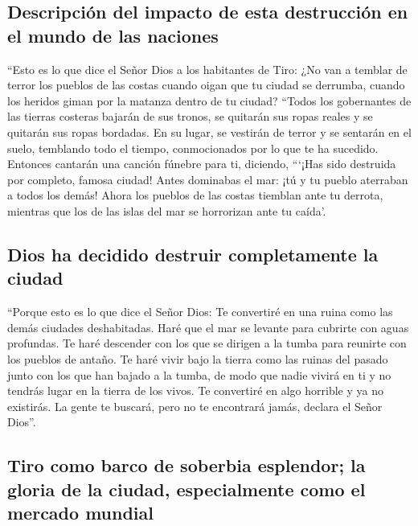 \hypertarget{descripciuxf3n-del-impacto-de-esta-destrucciuxf3n-en-el-mundo-de-las-naciones}{%
\subsection{Descripción del impacto de esta destrucción en el mundo de
las
naciones}\label{descripciuxf3n-del-impacto-de-esta-destrucciuxf3n-en-el-mundo-de-las-naciones}}

 ``Esto es lo que dice el Señor Dios a los habitantes de
Tiro: ¿No van a temblar de terror los pueblos de las costas cuando oigan
que tu ciudad se derrumba, cuando los heridos giman por la matanza
dentro de tu ciudad?  ``Todos los gobernantes de las
tierras costeras bajarán de sus tronos, se quitarán sus ropas reales y
se quitarán sus ropas bordadas. En su lugar, se vestirán de terror y se
sentarán en el suelo, temblando todo el tiempo, conmocionados por lo que
te ha sucedido.  Entonces cantarán una canción fúnebre
para ti, diciendo, ```¡Has sido destruida por completo, famosa ciudad!
Antes dominabas el mar: ¡tú y tu pueblo aterraban a todos los demás!
 Ahora los pueblos de las costas tiemblan ante tu
derrota, mientras que los de las islas del mar se horrorizan ante tu
caída'.

\hypertarget{dios-ha-decidido-destruir-completamente-la-ciudad}{%
\subsection{Dios ha decidido destruir completamente la
ciudad}\label{dios-ha-decidido-destruir-completamente-la-ciudad}}

 ``Porque esto es lo que dice el Señor Dios: Te
convertiré en una ruina como las demás ciudades deshabitadas. Haré que
el mar se levante para cubrirte con aguas profundas.  Te
haré descender con los que se dirigen a la tumba para reunirte con los
pueblos de antaño. Te haré vivir bajo la tierra como las ruinas del
pasado junto con los que han bajado a la tumba, de modo que nadie vivirá
en ti y no tendrás lugar en la tierra de los vivos.  Te
convertiré en algo horrible y ya no existirás. La gente te buscará, pero
no te encontrará jamás, declara el Señor Dios''.

\hypertarget{tiro-como-barco-de-soberbia-esplendor-la-gloria-de-la-ciudad-especialmente-como-el-mercado-mundial}{%
\subsection{Tiro como barco de soberbia esplendor; la gloria de la
ciudad, especialmente como el mercado
mundial}\label{tiro-como-barco-de-soberbia-esplendor-la-gloria-de-la-ciudad-especialmente-como-el-mercado-mundial}}

